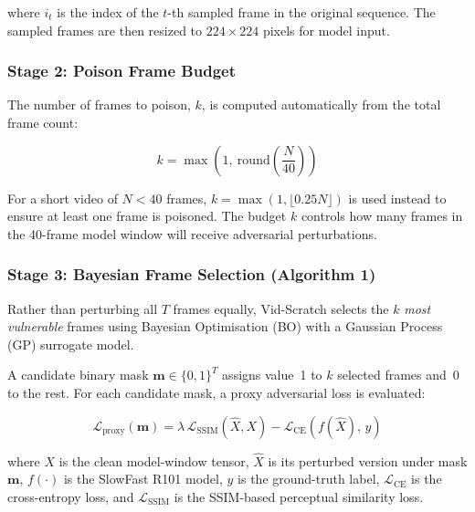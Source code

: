 \noindent
where $i_t$ is the index of the $t$-th sampled frame in the
original sequence. The sampled frames are then resized to
$224 \times 224$ pixels for model input.

\subsubsection{Stage 2: Poison Frame Budget}

The number of frames to poison, $k$, is computed automatically
from the total frame count:

\begin{equation}
    k = \max\!\left(1,\ \mathrm{round}\!\left(\frac{N}{40}\right)\right)
    \label{eq:poison-budget}
\end{equation}

\noindent
For a short video of $N < 40$ frames, $k = \max(1, \lfloor 0.25 N \rfloor)$
is used instead to ensure at least one frame is poisoned.
The budget $k$ controls how many frames in the 40-frame model
window will receive adversarial perturbations.

\subsubsection{Stage 3: Bayesian Frame Selection (Algorithm 1)}

Rather than perturbing all $T$ frames equally,
Vid-Scratch selects the $k$ \emph{most vulnerable} frames
using Bayesian Optimisation (BO) with a Gaussian Process (GP)
surrogate model.

A candidate binary mask $\mathbf{m} \in \{0,1\}^T$ assigns
value~1 to $k$ selected frames and~0 to the rest.
For each candidate mask, a proxy adversarial loss is evaluated:

\begin{equation}
    \mathcal{L}_{\text{proxy}}(\mathbf{m}) =
        \lambda \, \mathcal{L}_{\text{SSIM}}(\hat{X}, X)
        - \mathcal{L}_{\text{CE}}(f(\hat{X}),\, y)
    \label{eq:proxy-loss}
\end{equation}

\noindent
where $X$ is the clean model-window tensor,
$\hat{X}$ is its perturbed version under mask $\mathbf{m}$,
$f(\cdot)$ is the SlowFast R101 model,
$y$ is the ground-truth label,
$\mathcal{L}_{\text{CE}}$ is the cross-entropy loss, and
$\mathcal{L}_{\text{SSIM}}$ is the SSIM-based perceptual
similarity loss.

